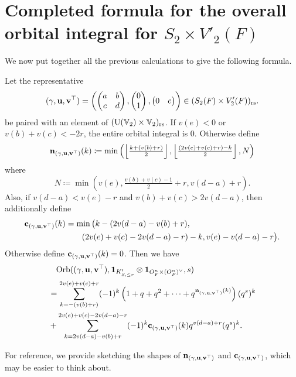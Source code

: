 \section{Completed formula for the overall orbital integral for $S_2 \times V'_2(F)$}
We now put together all the previous calculations to give the following formula.
\begin{theorem}
  \label{thm:semi_lie_formula}
  Let the representative
  \[
    {(\gamma, \mathbf u, \mathbf v^\top)} = \left( \begin{pmatrix} a & b \\ c & d \end{pmatrix},
      \begin{pmatrix} 0 \\ 1 \end{pmatrix},
      \begin{pmatrix} 0 & e \end{pmatrix} \right)
    \in (S_2(F) \times V_2'(F))_{\mathrm{rs}}.
  \]
  be paired with an element of $(\operatorname{U}(\mathbb V_2) \times \mathbb V_2)_{\mathrm{rs}}$.
  If $v(e) < 0$ or $v(b) + v(c) < -2r$, the entire orbital integral is $0$.
  Otherwise define
  \[ \mathbf n_{(\gamma, \mathbf u, \mathbf v^\top)}(k) \coloneqq \min\left( \left\lfloor \tfrac{k + (v(b)+r)}{2} \right\rfloor,
    \left\lfloor \tfrac{(2v(e)+v(c)+r)-k}{2} \right\rfloor, N \right) \]
  where
  \[ N \coloneqq \min \left(
      v(e), \tfrac{v(b)+v(c)-1}{2} + r,
      v(d-a) + r \right). \]
  Also, if $v(d-a) < v(e) - r$ and $v(b) + v(c) > 2v(d-a)$, then additionally define
  \begin{align*}
    \mathbf c_{(\gamma, \mathbf u, \mathbf v^\top)}(k) &= \min\big( k - (2v(d-a)-v(b)+r), \\
      &\qquad (2v(e)+v(c)-2v(d-a)-r)-k, v(e)-v(d-a)-r \big).
  \end{align*}
  Otherwise define $\mathbf c_{(\gamma, \mathbf u, \mathbf v^\top)}(k) = 0$.
  Then we have
  \begin{align*}
    &\phantom= \Orb(\guv, \mathbf{1}_{K'_{S, \le r}} \otimes \oneV, s) \\
    &= \sum_{k = -(v(b)+r)}^{2v(e)+v(c)+r} (-1)^k
    \left( 1 + q + q^2 + \dots + q^{\nn_\guv(k)} \right) (q^s)^k \\
    &+ \sum_{k = 2v(d-a)-v(b)+r}^{2v(e)+v(c)-2v(d-a)-r} (-1)^k \cc_\guv(k) q^{v(d-a) + r} (q^s)^k.
  \end{align*}
\end{theorem}

For reference, we provide  sketching the shapes
of $\mathbf n_{(\gamma, \mathbf u, \mathbf v^\top)}$ and $\mathbf c_{(\gamma, \mathbf u, \mathbf v^\top)}$, which may be easier to think about.

